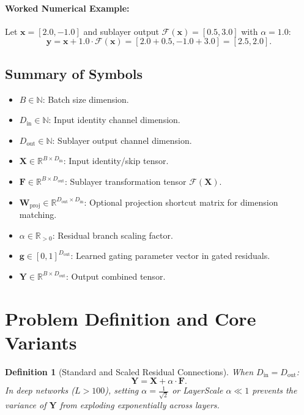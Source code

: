 \documentclass[11pt]{article}
\newtheorem{definition}{Definition}
\begin{document}
\paragraph{Worked Numerical Example:}
Let $\mathbf{x} = [2.0, -1.0]$ and sublayer output $\mathcal{F}(\mathbf{x}) = [0.5, 3.0]$ with $\alpha = 1.0$:
\begin{equation}
\mathbf{y} = \mathbf{x} + 1.0 \cdot \mathcal{F}(\mathbf{x}) = [2.0 + 0.5, -1.0 + 3.0] = [2.5, 2.0].
\end{equation}

\subsection{Summary of Symbols}
\begin{itemize}
    \item $B \in \mathbb{N}$: Batch size dimension.
    \item $D_{\text{in}} \in \mathbb{N}$: Input identity channel dimension.
    \item $D_{\text{out}} \in \mathbb{N}$: Sublayer output channel dimension.
    \item $\mathbf{X} \in \mathbb{R}^{B \times D_{\text{in}}}$: Input identity/skip tensor.
    \item $\mathbf{F} \in \mathbb{R}^{B \times D_{\text{out}}}$: Sublayer transformation tensor $\mathcal{F}(\mathbf{X})$.
    \item $\mathbf{W}_{\text{proj}} \in \mathbb{R}^{D_{\text{out}} \times D_{\text{in}}}$: Optional projection shortcut matrix for dimension matching.
    \item $\alpha \in \mathbb{R}_{>0}$: Residual branch scaling factor.
    \item $\mathbf{g} \in [0, 1]^{D_{\text{out}}}$: Learned gating parameter vector in gated residuals.
    \item $\mathbf{Y} \in \mathbb{R}^{B \times D_{\text{out}}}$: Output combined tensor.
\end{itemize}

\section{Problem Definition and Core Variants}
\label{sec:problem_definition}

\begin{definition}[Standard and Scaled Residual Connections]
When $D_{\text{in}} = D_{\text{out}}$:
\begin{equation}
\mathbf{Y} = \mathbf{X} + \alpha \cdot \mathbf{F}.
\end{equation}
In deep networks ($L > 100$), setting $\alpha = \frac{1}{\sqrt{2}}$ or LayerScale $\alpha \ll 1$ prevents the variance of $\mathbf{Y}$ from exploding exponentially across layers.
\end{definition}
\end{document}
